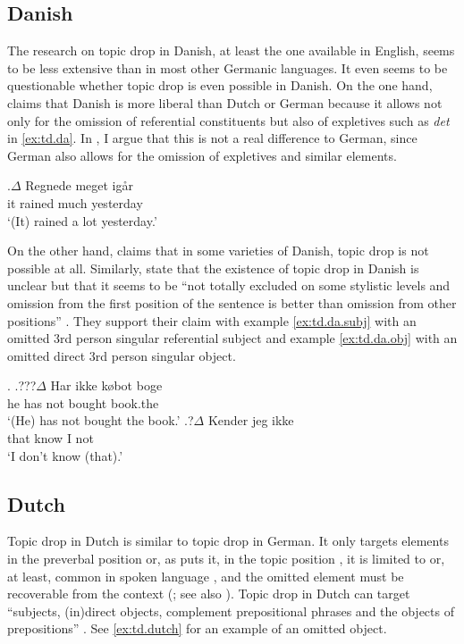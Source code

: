 \subsection{Danish} 
The research on topic drop in Danish, at least the one available in English, seems to be less extensive than in most other Germanic languages.
It even seems to be questionable whether topic drop is even possible in Danish.
On the one hand, \citet[141]{haegeman1996} claims that Danish is more liberal than Dutch  or German because it allows not only for the omission of referential constituents but also of expletives  such as \textit{det} in \ref{ex:td.da}.
In , I argue that this is not a real difference to German, since German also allows for the omission of expletives  and similar elements.

\exg.\label{ex:td.da}$\Delta$ Regnede meget igår\\
it rained much yesterday\\
`(It) rained a lot yesterday.' \citep[141]{haegeman1996}

On the other hand, \citet[283]{rizzi2000} claims that in some varieties of Danish, topic drop is not possible at all.
Similarly, \citet{hamann.plunkett1998} state that the existence of topic drop in Danish is unclear but that it seems to be ``not totally excluded on some stylistic levels and omission from the first position of the sentence is better than omission from other positions'' \citep[49]{hamann.plunkett1998}.
They support their claim with example \ref{ex:td.da.subj} with an omitted 3rd person singular referential subject and example \ref{ex:td.da.obj} with an omitted direct 3rd person singular object.

\setlength{\SubExleftmargin}{2.4em}
\ex.
\ag.???$\Delta$ Har ikke købot boge\label{ex:td.da.subj}\\
he has not bought book.the\\
`(He) has not bought the book.'
\bg.?$\Delta$ Kender jeg ikke\label{ex:td.da.obj}\\
that know I not\\
`I don't know (that).' \citep[49, their judgments]{hamann.plunkett1998}

\resetExdefaults
{}

\subsection{Dutch} 
Topic drop in Dutch is similar to topic drop in German.
It only targets elements in the preverbal position or, as \citet{thrift2001} puts it, in the topic position \citep[71]{thrift2001}, it is limited to \citep[57]{thrift2001} or, at least, common in spoken language \citep[54]{weerman1989}, and the omitted element must be recoverable  from the context (\cite[1329]{corver.broekhuis2016}; see also \cite[71]{thrift2001}).
Topic drop in Dutch can target ``subjects, (in)direct objects, complement prepositional phrases and the objects of prepositions'' \citep[49]{thrift2001}. 
See \ref{ex:td.dutch} for an example of an omitted object.

